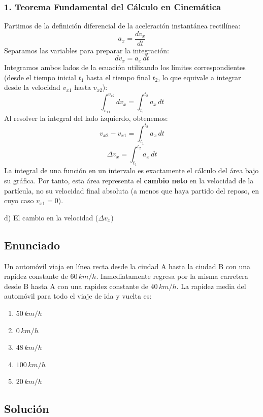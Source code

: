 \documentclass[12pt, a4paper]{article}
\begin{document}
\subsubsection*{1. Teorema Fundamental del Cálculo en Cinemática}
Partimos de la definición diferencial de la aceleración instantánea rectilínea:
$$ a_x = \frac{dv_x}{dt} $$
Separamos las variables para preparar la integración:
$$ dv_x = a_x \, dt $$
Integramos ambos lados de la ecuación utilizando los límites correspondientes (desde el tiempo inicial $t_1$ hasta el tiempo final $t_2$, lo que equivale a integrar desde la velocidad $v_{x1}$ hasta $v_{x2}$):
$$ \int_{v_{x1}}^{v_{x2}} dv_x = \int_{t_1}^{t_2} a_x \, dt $$
Al resolver la integral del lado izquierdo, obtenemos:
$$ v_{x2} - v_{x1} = \int_{t_1}^{t_2} a_x \, dt $$
$$ \Delta v_x = \int_{t_1}^{t_2} a_x \, dt $$
La integral de una función en un intervalo es exactamente el cálculo del área bajo su gráfica. Por tanto, esta área representa el \textbf{cambio neto} en la velocidad de la partícula, no su velocidad final absoluta (a menos que haya partido del reposo, en cuyo caso $v_{x1} = 0$).

\begin{tcolorbox}[colback=green!5!white, colframe=green!50!black, title=Respuesta Final]
\centering \Large d) El cambio en la velocidad ($\Delta v_x$)
\end{tcolorbox}

\newpage

\subsection*{Enunciado}
Un automóvil viaja en línea recta desde la ciudad A hasta la ciudad B con una rapidez constante de $60\,\si{km/h}$. Inmediatamente regresa por la misma carretera desde B hasta A con una rapidez constante de $40\,\si{km/h}$. La rapidez media del automóvil para todo el viaje de ida y vuelta es:
\begin{enumerate}[label=\alph*)]
    \item $50\,\si{km/h}$
    \item $0\,\si{km/h}$
    \item $48\,\si{km/h}$
    \item $100\,\si{km/h}$
    \item $20\,\si{km/h}$
\end{enumerate}

\subsection*{Solución}
\end{document}
